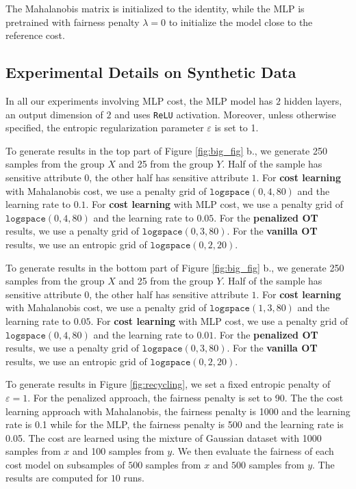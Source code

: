 \documentclass{article}
\theoremstyle{definition}
\begin{document}
The Mahalanobis matrix is initialized to the identity, while the MLP is pretrained with fairness penalty $\lambda = 0$ to initialize the model close to the reference cost.
\subsection{Experimental Details on Synthetic Data}
In all our experiments involving MLP cost, the MLP model has $2$ hidden layers, an output dimension of $2$ and uses \texttt{ReLU} activation. Moreover, unless otherwise specified, the entropic regularization parameter $\varepsilon$ is set to 1.

To generate results in the top part of Figure \ref{fig:big_fig} b., we generate 250 samples from the group $X$ and 25 from the group $Y$. Half of the sample has sensitive attribute $0$, the other half has sensitive attribute $1$. For \textbf{cost learning} with Mahalanobis cost, we use a penalty grid of $\texttt{logspace}(0, 4, 80)$ and the learning rate to $0.1$. For \textbf{cost learning} with MLP cost, we use a penalty grid of $\texttt{logspace}(0, 4, 80)$ and the learning rate to $0.05$.  For the \textbf{penalized OT} results, we use a penalty grid of $\texttt{logspace}(0, 3, 80)$. For the \textbf{vanilla OT} results, we use an entropic grid of $\texttt{logspace}(0, 2, 20)$.

To generate results in the bottom part of Figure \ref{fig:big_fig} b., we generate 250 samples from the group $X$ and 25 from the group $Y$. Half of the sample has sensitive attribute $0$, the other half has sensitive attribute $1$. For \textbf{cost learning} with Mahalanobis cost, we use a penalty grid of $\texttt{logspace}(1, 3, 80)$ and the learning rate to $0.05$. For \textbf{cost learning} with MLP cost, we use a penalty grid of $\texttt{logspace}(0, 4, 80)$ and the learning rate to $0.01$.  For the \textbf{penalized OT} results, we use a penalty grid of $\texttt{logspace}(0, 3, 80)$. For the \textbf{vanilla OT} results, we use an entropic grid of $\texttt{logspace}(0, 2, 20)$.

To generate results in Figure \ref{fig:recycling}, we set a fixed entropic penalty of $\varepsilon=1$. For the penalized approach, the fairness penalty is set to 90. The the cost learning approach with Mahalanobis, the fairness penalty is 1000 and the learning rate is 0.1 while for the MLP, the fairness penalty is 500 and the learning rate is 0.05. The cost are learned using the mixture of Gaussian dataset with 1000 samples from $x$ and 100 samples from $y$. We then evaluate the fairness of each cost model on subsamples of $500$ samples from $x$ and $500$ samples from $y$. The results are computed for $10$ runs. 
\end{document}
